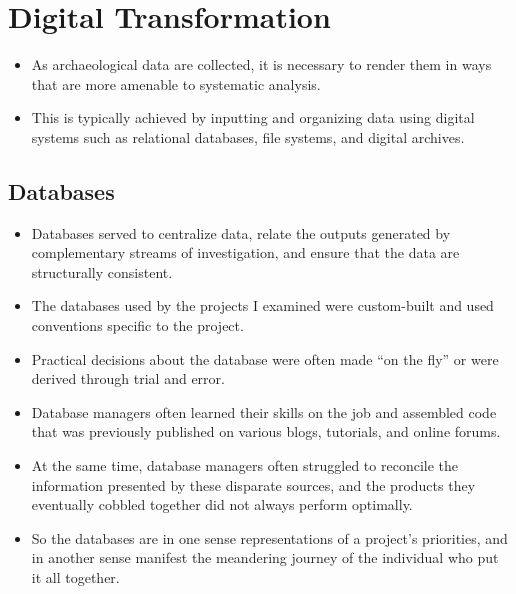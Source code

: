 \documentclass{article}
\begin{document}
\section{Digital Transformation}
\begin{itemize}
  \item As archaeological data are collected, it is necessary to render them in ways that are more amenable to systematic analysis.

  \item This is typically achieved by inputting and organizing data using digital systems such as relational databases, file systems, and digital archives.
\end{itemize}

\subsection{Databases}
\begin{itemize}
  \item Databases served to centralize data, relate the outputs generated by complementary streams of investigation, and ensure that the data are structurally consistent.

  \item The databases used by the projects I examined were custom-built and used conventions specific to the project.
  \item Practical decisions about the database were often made “on the fly” or were derived through trial and error.
  \item Database managers often learned their skills on the job and assembled code that was previously published on various blogs, tutorials, and online forums.
  \item At the same time, database managers often struggled to reconcile the information presented by these disparate sources, and the products they eventually cobbled together did not always perform optimally.
  \item So the databases are in one sense representations of a project's priorities, and in another sense manifest the meandering journey of the individual who put it all together.
\end{itemize}
\end{document}
